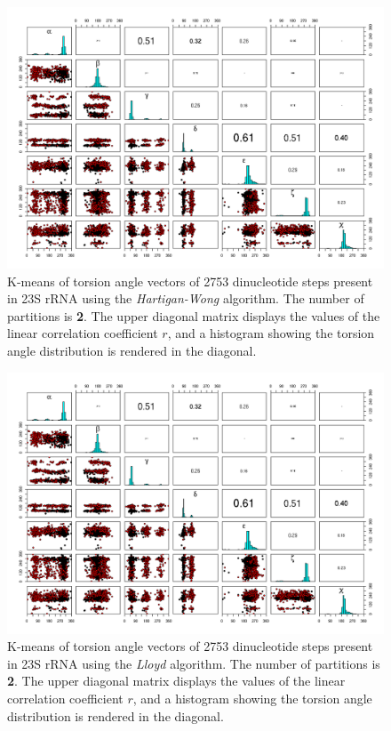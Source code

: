 \begin{figure}[htbp]
\centering
\includegraphics[angle=90, scale=0.50]{Chapter2/hartigan_tor_b.png}
\caption{
K-means of torsion  angle vectors of 2753 dinucleotide steps
present in  23S rRNA using the  \textit{Hartigan-Wong} algorithm.  The
number  of  partitions  is  \textbf{2}.   The  upper  diagonal  matrix
displays the values  of the linear correlation coefficient  $r$, and a
histogram showing  the torsion angle distribution is rendered  in the
diagonal.}
\label{fig:hartigan}
\end{figure}

\begin{figure}[htbp]
\centering
\includegraphics[angle=90, scale=0.50]{Chapter2/lloyd_tor_b.png}
\caption{
K-means of torsion  angle vectors of 2753 dinucleotide steps
present in  23S rRNA using the  \textit{Lloyd} algorithm.  The
number  of  partitions  is  \textbf{2}.   The  upper  diagonal  matrix
displays the values  of the linear correlation coefficient  $r$, and a
histogram showing  the torsion angle  distribution is rendered  in the
diagonal.}
\end{figure}

